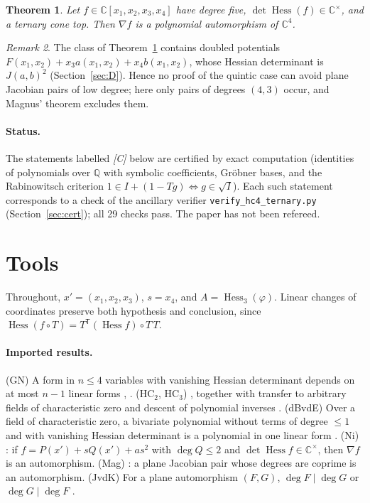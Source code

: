 \documentclass[11pt]{article}
\newtheorem{theorem}{Theorem}
\theoremstyle{remark}
\newtheorem{remark}[theorem]{Remark}
\newcommand{\C}{\mathbb{C}}
\newcommand{\Hess}{\operatorname{Hess}}
\begin{document}
\begin{theorem}\label{thm:main}
Let $f\in\C[x_1,x_2,x_3,x_4]$ have degree five, $\det\Hess(f)\in\C^\times$, and a ternary cone top. Then $\nabla f$ is a polynomial automorphism of $\C^4$.
\end{theorem}

\begin{remark}
The class of Theorem~\ref{thm:main} contains doubled potentials $F(x_1,x_2)+x_3a(x_1,x_2)+x_4b(x_1,x_2)$, whose Hessian determinant is $J(a,b)^2$ (Section~\ref{sec:D}). Hence no proof of the quintic case can avoid plane Jacobian pairs of low degree; here only pairs of degrees $(4,3)$ occur, and Magnus' theorem excludes them.
\end{remark}

\paragraph{Status.} The statements labelled \emph{[C]} below are certified by exact computation (identities of polynomials over $\mathbb{Q}$ with symbolic coefficients, Gr\"obner bases, and the Rabinowitsch criterion $1\in I+(1-Tg)\Leftrightarrow g\in\sqrt I$). Each such statement corresponds to a check of the ancillary verifier \texttt{verify\_hc4\_ternary.py} (Section~\ref{sec:cert}); all 29 checks pass. The paper has not been refereed.

\section{Tools}
Throughout, $x'=(x_1,x_2,x_3)$, $s=x_4$, and $A=\Hess_3(\varphi)$. Linear changes of coordinates preserve both hypothesis and conclusion, since $\Hess(f\circ T)=T^{\mathsf T}(\Hess f)\circ T\,T$.

\paragraph{Imported results.}
(GN) A form in $n\le4$ variables with vanishing Hessian determinant depends on at most $n-1$ linear forms \cite{GN}, \cite[Thm.~3.1]{deBondtQT}.
(HC$_2$, HC$_3$) \cite{Dillen,deBondt3}, together with transfer to arbitrary fields of characteristic zero and descent of polynomial inverses \cite[Lemmas~2.6, 2.7]{Ni}.
(dBvdE) Over a field of characteristic zero, a bivariate polynomial without terms of degree $\le1$ and with vanishing Hessian determinant is a polynomial in one linear form \cite[Thm.~3.1]{dBvdE}.
(Ni) \cite[Prop.~6.1]{Ni}: if $f=P(x')+sQ(x')+as^2$ with $\deg Q\le2$ and $\det\Hess f\in\C^\times$, then $\nabla f$ is an automorphism.
(Mag) \cite{Magnus}: a plane Jacobian pair whose degrees are coprime is an automorphism.
(JvdK) For a plane automorphism $(F,G)$, $\deg F\mid\deg G$ or $\deg G\mid\deg F$ \cite[Ch.~5]{vdE}.
\end{document}
